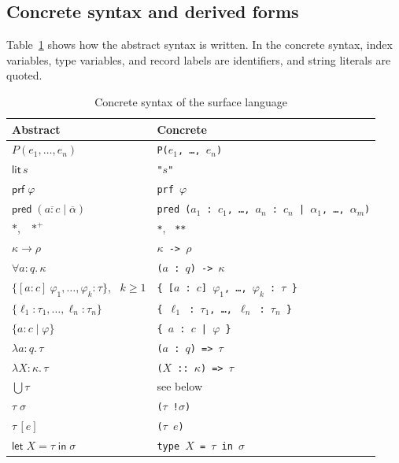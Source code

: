 \documentclass[11pt]{article}
\newcommand{\kw}[1]{\mathsf{#1}}
\newcommand{\lit}[1]{\kw{lit}\,#1}
\newcommand{\prf}[1]{\kw{prf}\;#1}
\newcommand{\pred}[1]{\kw{pred}\;#1}
\newcommand{\letin}[3]{\kw{let}\;#1 = #2\;\kw{in}\;#3}
\newcommand{\proper}{\ast}
\newcommand{\populated}{\ast^{+}}
\newcommand{\kall}[3]{\forall #1 : #2.\,#3}
\newcommand{\gdict}[4]{\{[#1 : #2]\ #3 : #4\}}
\newcommand{\refine}[3]{\{#1 : #2 \mid #3\}}
\newcommand{\iabs}[3]{\lambda #1 : #2.\,#3}
\newcommand{\tabs}[3]{\lambda #1 : #2.\,#3}
\newcommand{\union}[1]{\textstyle\bigcup #1}
\newcommand{\iapp}[2]{#1\,[#2]}
\newcommand{\code}[1]{\texttt{#1}}
\theoremstyle{remark}
\begin{document}
\subsection{Concrete syntax and derived forms}
\label{sec:concrete}

Table~\ref{tab:concrete} shows how the abstract syntax is written. In the concrete syntax, index
variables, type variables, and record labels are identifiers, and string literals are quoted.

\begin{table}[!htbp]
\centering
\begin{tabular}{ll}
\toprule
Abstract & Concrete \\
\midrule
$P(e_1, \ldots, e_n)$ & \code{P($e_1$, \ldots, $e_n$)} \\
$\lit{s}$ & \code{"$s$"} \\
$\prf{\varphi}$ & \code{prf $\varphi$} \\
$\pred{(\overline{a : c} \mid \overline{\alpha})}$
  & \code{pred ($a_1$ :\ $c_1$, \ldots, $a_n$ :\ $c_n$ | $\alpha_1$, \ldots, $\alpha_m$)} \\
$\proper$, \ $\populated$ & \code{*}, \ \code{**} \\
$\kappa \to \rho$ & \code{$\kappa$ -> $\rho$} \\
$\kall{a}{q}{\kappa}$ & \code{($a$ :\ $q$) -> $\kappa$} \\
$\gdict{a}{c}{\varphi_1, \ldots, \varphi_k}{\tau}$, \ $k \geq 1$
  & \code{\{ [$a$ :\ $c$] $\varphi_1$, \ldots, $\varphi_k$ :\ $\tau$ \}} \\
$\{\ell_1 : \tau_1, \ldots, \ell_n : \tau_n\}$ & \code{\{ $\ell_1$ :\ $\tau_1$, \ldots, $\ell_n$ :\ $\tau_n$ \}} \\
$\refine{a}{c}{\varphi}$ & \code{\{ $a$ :\ $c$ | $\varphi$ \}} \\
$\iabs{a}{q}{\tau}$ & \code{($a$ :\ $q$) => $\tau$} \\
$\tabs{X}{\kappa}{\tau}$ & \code{($X$ ::\ $\kappa$) => $\tau$} \\
$\union{\tau}$ & see below \\
$\tau\;\sigma$ & \code{($\tau$ !$\sigma$)} \\
$\iapp{\tau}{e}$ & \code{($\tau$ $e$)} \\
$\letin{X}{\tau}{\sigma}$ & \code{type $X$ = $\tau$ in $\sigma$} \\
\bottomrule
\end{tabular}
\caption{Concrete syntax of the surface language}
\label{tab:concrete}
\end{table}
\end{document}
